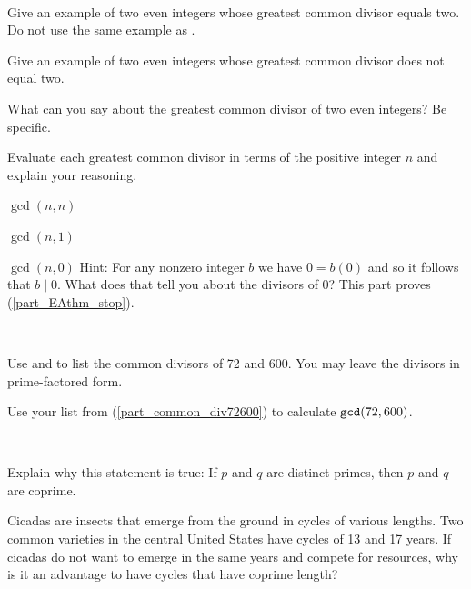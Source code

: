 \begin{exer}[\exerU] %
\label{exer_gcd_evens}
~
    \begin{exerpart}
        \item Give an example of two even integers whose greatest common divisor equals two.  Do not use the same example as .
        \item \label{part_gcd_cex_evens} Give an example of two even integers whose greatest common divisor does not equal two.
        \item What can you say about the greatest common divisor of two even integers? Be specific.
    \end{exerpart}
\end{exer}

\begin{exer}[\exerU] %
\label{exer_gcd_extreme}
    Evaluate each greatest common divisor in terms of the positive integer $n$ and explain your reasoning.    
        \begin{exerpart}
            \item $\gcd(n,n)$
            \item $\gcd(n,1)$
            \item \label{part_proof_EAthm_stop} $\gcd(n,0)$  Hint:  For any nonzero integer $b$ we have $0 = b(0)$ and so it follows that $b \mid 0$.  What does that tell you about the divisors of 0?  This part proves  (\ref{part_EAthm_stop}).
    \end{exerpart}
\end{exer}

\begin{exer}[\exerU] %
\label{exer_gcd72600}
~
    \begin{exerpart}
        \item \label{part_common_div72600} Use  and  to list the common divisors of 72 and 600.  You may leave the divisors in prime-factored form.
        \item Use your list from (\ref{part_common_div72600}) to calculate $\texttt{gcd}(72,600)$.
    \end{exerpart}
\end{exer}

\begin{exer}[\exerU] %
\label{gcd_of_primes,_cicadas}
~
\begin{exerpart}
    \item Explain why this statement is true: If $p$ and $q$ are distinct primes, then $p$ and $q$ are coprime.  
    \item Cicadas are insects that emerge from the ground in cycles of various lengths.  Two common varieties in the central United States have cycles of 13 and 17 years.  If cicadas do not want to emerge in the same years and compete for resources, why is it an advantage to have cycles that have coprime length? 
\end{exerpart}
\end{exer}

